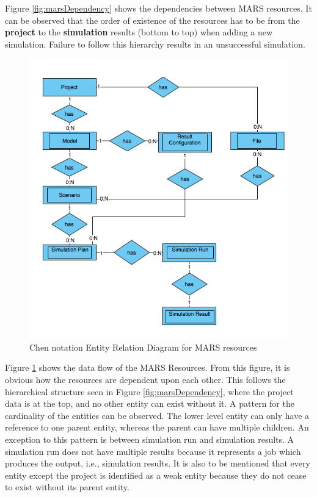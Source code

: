         Figure \ref{fig:marsDependency} shows the dependencies between MARS resources. It can be observed
        that the order of existence of the resources has to be from the \textbf{project} to the \textbf{simulation} results 
        (bottom to top) when adding a new simulation. Failure to follow this hierarchy results in an
        unsuccessful simulation.

        \begin{figure}[H]
            \centering \includegraphics[scale=0.6]{grafiken/ERMars.png}
            \caption{Chen notation Entity Relation Diagram for MARS resources}
            \label{fig:ERMars}
        \end{figure}
        
        Figure \ref{fig:ERMars} shows the data flow of the MARS Resources. From this figure, it is obvious 
        how the resources are dependent upon each other. This follows the hierarchical structure seen in Figure \ref{fig:marsDependency},
        where the project data is at the top, and no other entity can exist without it. A pattern for the cardinality of the entities can be observed.
        The lower level entity can only have a reference to one parent entity, whereas the parent can have multiple children. An exception to this
        pattern is between simulation run and simulation results. A simulation run does not have multiple results because it represents a job which produces
        the output, i.e., simulation results. It is also to be mentioned that every entity except the project is identified as a weak entity because they do not cease
        to exist without its parent entity. 

